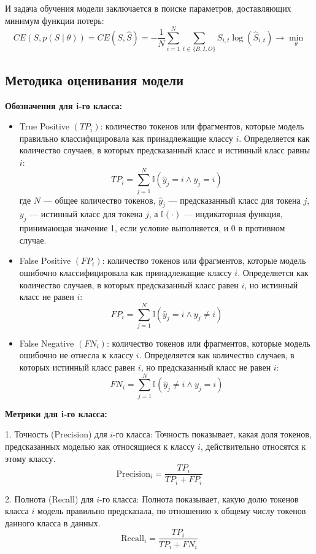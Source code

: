 \documentclass[12pt]{article}
\begin{document}
И задача обучения модели заключается в поиске параметров, доставляющих минимум функции потерь:
$$
CE(S, p(S \mid \theta)) = CE(S, \hat{S}) = -\frac{1}{N} \sum_{i=1}^{N} \sum_{t \in \{B, I, O\}} S_{i, t} \log(\hat{S}_{i, t}) \longrightarrow \min_{\theta}
$$

\subsection{Методика оценивания модели}
\textbf{Обозначения для i-го класса:}
\begin{itemize}
    \item True Positive $(TP_i)$: количество токенов или фрагментов, которые модель правильно классифицировала как принадлежащие классу $i$. Определяется как количество случаев, в которых предсказанный класс и истинный класс равны $i$:
    \[
    TP_i = \sum_{j=1}^{N} \mathbb{I}(\hat{y}_j = i \land y_j = i)
    \]
    где $N$ — общее количество токенов, $\hat{y}_j$ — предсказанный класс для токена $j$, $y_j$ — истинный класс для токена $j$, а $\mathbb{I}(\cdot)$ — индикаторная функция, принимающая значение 1, если условие выполняется, и 0 в противном случае.

    \item False Positive $(FP_i)$: количество токенов или фрагментов, которые модель ошибочно классифицировала как принадлежащие классу $i$. Определяется как количество случаев, в которых предсказанный класс равен $i$, но истинный класс не равен $i$:
    \[
    FP_i = \sum_{j=1}^{N} \mathbb{I}(\hat{y}_j = i \land y_j \neq i)
    \]

    \item False Negative $(FN_i)$: количество токенов или фрагментов, которые модель ошибочно не отнесла к классу $i$. Определяется как количество случаев, в которых истинный класс равен $i$, но предсказанный класс не равен $i$:
    \[
    FN_i = \sum_{j=1}^{N} \mathbb{I}(\hat{y}_j \neq i \land y_j = i)
    \]
\end{itemize}


\textbf{Метрики для i-го класса:}

1. Точность (Precision) для \( i \)-го класса: Точность показывает, какая доля токенов, предсказанных моделью как относящиеся к классу \( i \), действительно относятся к этому классу.
\[
\text{Precision}_i = \frac{TP_i}{TP_i + FP_i}
\]

2. Полнота (Recall) для \( i \)-го класса: Полнота показывает, какую долю токенов класса \( i \) модель правильно предсказала, по отношению к общему числу токенов данного класса в данных.
\[
\text{Recall}_i = \frac{TP_i}{TP_i + FN_i}
\]
\end{document}
